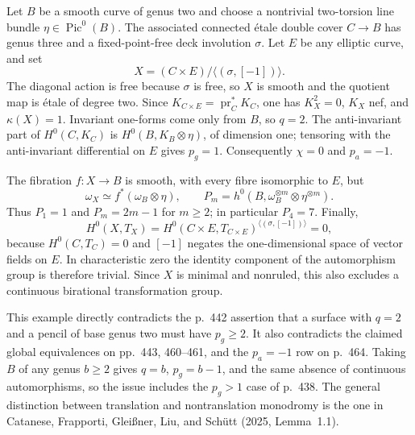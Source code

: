 \begin{example}[A smooth isotrivial fibration with \(p_g=1\), \(q=2\), and no continuous automorphisms]
\label{cp2-xi-monodromy-example}
Let \(B\) be a smooth curve of genus two and choose a nontrivial two-torsion line bundle \(\eta\in\operatorname{Pic}^0(B)\). The associated connected \'etale double cover \(C\to B\) has genus three and a fixed-point-free deck involution \(\sigma\). Let \(E\) be any elliptic curve, and set
\[
X=(C\times E)/\langle(\sigma,[-1])\rangle.
\]
The diagonal action is free because \(\sigma\) is free, so \(X\) is smooth and the quotient map is \'etale of degree two. Since \(K_{C\times E}=\operatorname{pr}_C^*K_C\), one has \(K_X^2=0\), \(K_X\) nef, and \(\kappa(X)=1\). Invariant one-forms come only from \(B\), so \(q=2\). The anti-invariant part of \(H^0(C,K_C)\) is \(H^0(B,K_B\otimes\eta)\), of dimension one; tensoring with the anti-invariant differential on \(E\) gives \(p_g=1\). Consequently \(\chi=0\) and \(p_a=-1\).

The fibration \(f:X\to B\) is smooth, with every fibre isomorphic to \(E\), but
\[
\omega_X\simeq f^*(\omega_B\otimes\eta),\qquad
P_m=h^0(B,\omega_B^{\otimes m}\otimes\eta^{\otimes m}).
\]
Thus \(P_1=1\) and \(P_m=2m-1\) for \(m\ge2\); in particular \(P_4=7\). Finally,
\[
H^0(X,T_X)=H^0(C\times E,T_{C\times E})^{\langle(\sigma,[-1])\rangle}=0,
\]
because \(H^0(C,T_C)=0\) and \([-1]\) negates the one-dimensional space of vector fields on \(E\). In characteristic zero the identity component of the automorphism group is therefore trivial. Since \(X\) is minimal and nonruled, this also excludes a continuous birational transformation group.
\end{example}

This example directly contradicts the p.~442 assertion that a surface with \(q=2\) and a pencil of base genus two must have \(p_g\ge2\). It also contradicts the claimed global equivalences on pp.~443, 460--461, and the \(p_a=-1\) row on p.~464. Taking \(B\) of any genus \(b\ge2\) gives \(q=b\), \(p_g=b-1\), and the same absence of continuous automorphisms, so the issue includes the \(p_g>1\) case of p.~438. The general distinction between translation and nontranslation monodromy is the one in Catanese, Frapporti, Glei\ss ner, Liu, and Sch\"utt (2025, Lemma~1.1).

